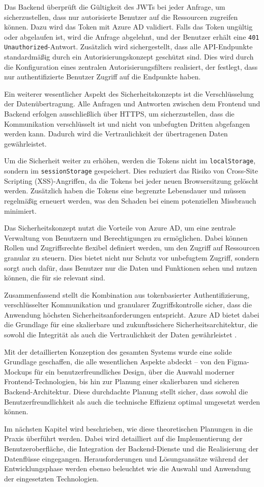 Das Backend überprüft die Gültigkeit des JWTs bei jeder Anfrage, um sicherzustellen, dass nur autorisierte Benutzer auf die Ressourcen zugreifen können. Dazu wird das Token mit Azure AD validiert. Falls das Token ungültig oder abgelaufen ist, wird die Anfrage abgelehnt, und der Benutzer erhält eine \texttt{401 Unauthorized}-Antwort. Zusätzlich wird sichergestellt, dass alle API-Endpunkte standardmäßig durch ein Autorisierungskonzept geschützt sind. Dies wird durch die Konfiguration eines zentralen Autorisierungsfilters realisiert, der festlegt, dass nur authentifizierte Benutzer Zugriff auf die Endpunkte haben.

Ein weiterer wesentlicher Aspekt des Sicherheitskonzepts ist die Verschlüsselung der Datenübertragung. Alle Anfragen und Antworten zwischen dem Frontend und Backend erfolgen ausschließlich über HTTPS, um sicherzustellen, dass die Kommunikation verschlüsselt ist und nicht von unbefugten Dritten abgefangen werden kann. Dadurch wird die Vertraulichkeit der übertragenen Daten gewährleistet.

Um die Sicherheit weiter zu erhöhen, werden die Tokens nicht im \texttt{localStorage}, sondern im \texttt{sessionStorage} gespeichert. Dies reduziert das Risiko von Cross-Site Scripting (XSS)-Angriffen, da die Tokens bei jeder neuen Browsersitzung gelöscht werden. Zusätzlich haben die Tokens eine begrenzte Lebensdauer und müssen regelmäßig erneuert werden, was den Schaden bei einem potenziellen Missbrauch minimiert.

Das Sicherheitskonzept nutzt die Vorteile von Azure AD, um eine zentrale Verwaltung von Benutzern und Berechtigungen zu ermöglichen. Dabei können Rollen und Zugriffsrechte flexibel definiert werden, um den Zugriff auf Ressourcen granular zu steuern. Dies bietet nicht nur Schutz vor unbefugtem Zugriff, sondern sorgt auch dafür, dass Benutzer nur die Daten und Funktionen sehen und nutzen können, die für sie relevant sind.

Zusammenfassend stellt die Kombination aus tokenbasierter Authentifizierung, verschlüsselter Kommunikation und granularer Zugriffskontrolle sicher, dass die Anwendung höchsten Sicherheitsanforderungen entspricht. Azure AD bietet dabei die Grundlage für eine skalierbare und zukunftssichere Sicherheitsarchitektur, die sowohl die Integrität als auch die Vertraulichkeit der Daten gewährleistet \cite{msal2023, jwt2015}.

Mit der detaillierten Konzeption des gesamten Systems wurde eine solide Grundlage geschaffen, die alle wesentlichen Aspekte abdeckt – von den Figma-Mockups für ein benutzerfreundliches Design, über die Auswahl moderner Frontend-Technologien, bis hin zur Planung einer skalierbaren und sicheren Backend-Architektur. Diese durchdachte Planung stellt sicher, dass sowohl die Benutzerfreundlichkeit als auch die technische Effizienz optimal umgesetzt werden können.

Im nächsten Kapitel wird beschrieben, wie diese theoretischen Planungen in die Praxis überführt werden. Dabei wird detailliert auf die Implementierung der Benutzeroberfläche, die Integration der Backend-Dienste und die Realisierung der Datenflüsse eingegangen. Herausforderungen und Lösungsansätze während der Entwicklungsphase werden ebenso beleuchtet wie die Auswahl und Anwendung der eingesetzten Technologien.
